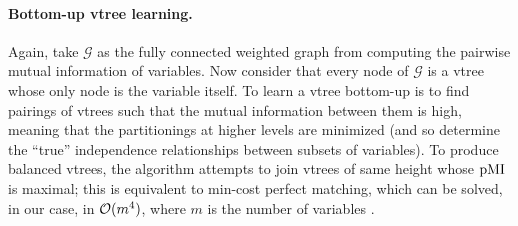 \paragraph{Bottom-up vtree learning.} Again, take $\mathcal{G}$ as the fully connected weighted
graph from computing the pairwise mutual information of variables. Now consider that every node of
$\mathcal{G}$ is a vtree whose only node is the variable itself. To learn a vtree bottom-up is to
find pairings of vtrees such that the mutual information between them is high, meaning that the
partitionings at higher levels are minimized (and so determine the ``true'' independence
relationships between subsets of variables). To produce balanced vtrees, the algorithm attempts to
join vtrees of same height whose $\operatorname{\normalfont{pMI}}$ is maximal; this is equivalent to min-cost perfect
matching, which can be solved, in our case, in $\mathcal{O}(m^4)$, where $m$ is the number of variables
\citep{edmonds65,kolmogorov09}.

